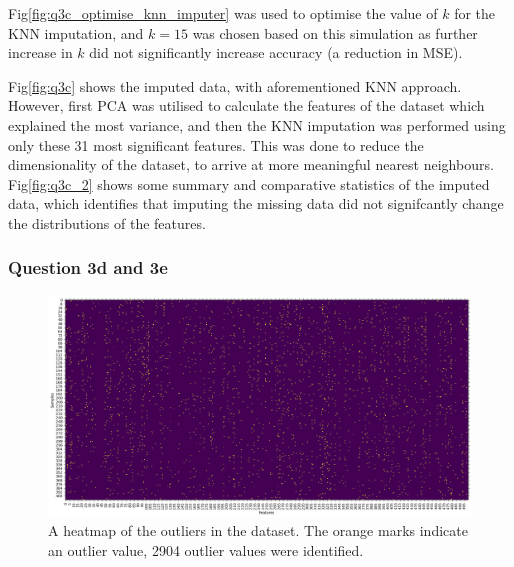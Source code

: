    Fig\eqref{fig:q3c_optimise_knn_imputer} was used to optimise the value of $k$ for the KNN imputation, and
    $k=15$ was chosen based on this simulation as further increase in $k$ did not significantly increase accuracy
    (a reduction in MSE).

    Fig\eqref{fig:q3c} shows the imputed data, with aforementioned KNN approach.
    However, first PCA was utilised to calculate the features of the dataset which explained the most variance, and
    then the KNN imputation was performed using only these 31 most significant features.
    This was done to reduce the dimensionality of the dataset, to arrive at more meaningful nearest neighbours.
    Fig\eqref{fig:q3c_2} shows some summary and comparative statistics of the imputed data, which identifies that
    imputing the missing data did not signifcantly change the distributions of the features.

\subsubsection{Question 3d and 3e}\label{subsubsec:q3de}
    \begin{figure}[htb]
    \centering
    \includegraphics[width=1\textwidth]{./figures/q3d_heatmap}
    \caption{A heatmap of the outliers in the  dataset. The orange marks indicate an
        outlier value, 2904 outlier values were identified.}
    \label{fig:q3d_heatmap}
    \end{figure}

